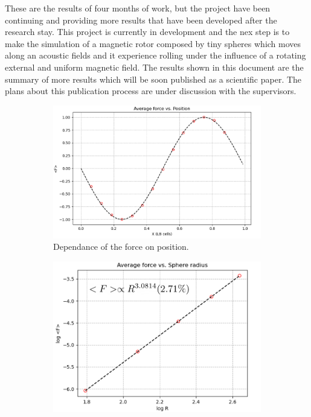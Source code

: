These are the results of four months of work, but the project have been continuing and providing more results that have been developed after the research stay. This project is currently in development and the nex step is to make the simulation of a magnetic rotor composed by tiny spheres which moves along an acoustic fields and it experience rolling under the influence of a rotating external and uniform magnetic field. The results shown in this document are the summary of more results which will be soon published as a scientific paper. The plans about this publication process are under discussion with the supervisors.

\begin{figure}
    \begin{subfigure}{0.4\textwidth}
    \centering
    \includegraphics[width=\textwidth]{images/Results/Position.PNG}
    \caption{Dependance of the force on position.}
    \label{fig:position}
    \end{subfigure}
    \begin{subfigure}{0.35\textwidth}
    \centering
    \includegraphics[width=\textwidth]{images/Results/Radius.PNG}

\end{subfigure}
\end{figure}
